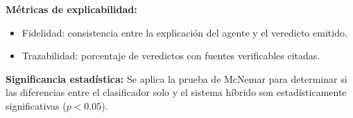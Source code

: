 \textbf{Métricas de explicabilidad:}
\begin{itemize}
    \item Fidelidad: consistencia entre la explicación del agente y el veredicto emitido.
    \item Trazabilidad: porcentaje de veredictos con fuentes verificables citadas.
\end{itemize}

\textbf{Significancia estadística:} Se aplica la prueba de McNemar para determinar si las diferencias entre el clasificador solo y el sistema híbrido son estadísticamente significativas ($p < 0.05$).
